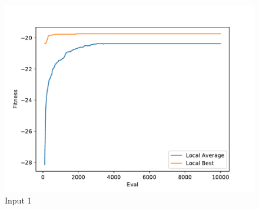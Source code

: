 \documentclass{standalone}
\begin{document}
\begin{figure}[!htb]
	\caption{Input 1}
	\label{fig:graph_1039}
	\includegraphics[width=\textwidth]{../graphs/graphs/1039.pdf}
\end{figure}
\end{document}
